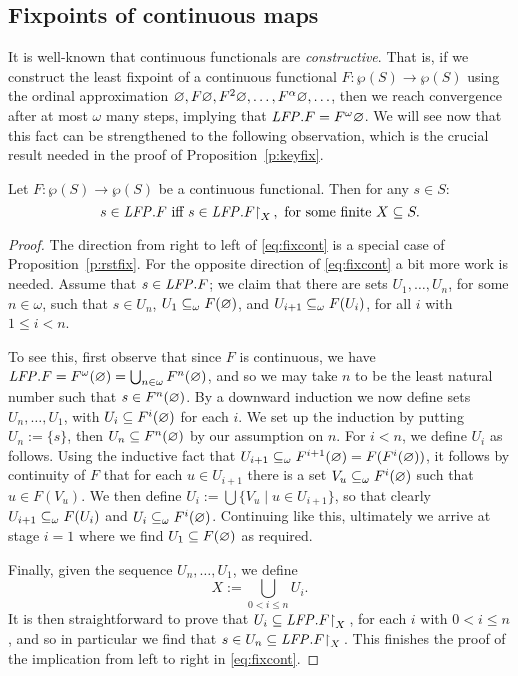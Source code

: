 
\subsection{Fixpoints of continuous maps}

It is well-known that continuous functionals are \emph{constructive}.
That is, if we construct the least fixpoint of a continuous functional $F: 
\wp(S) \to \wp(S)$ using the ordinal approximation $\varnothing, F\varnothing, F^2\varnothing, 
\ldots, F^{\alpha}\varnothing, \ldots$, then we reach convergence after at most $\omega$
many steps, implying that $\mathit{LFP}. F = F^{\omega}\varnothing$.
We will see now that this fact can be strengthened to the following observation,
which is the crucial result needed in the proof of Proposition~\ref{p:keyfix}.

\begin{theorem}
\label{t:fixcont}
Let $F: \wp(S)\to \wp(S)$ be a continuous functional.
Then for any $s \in S$:
\begin{equation}
\label{eq:fixcont}
s \in \LFP. F \text{ iff }
s \in \LFP.F\rst{X}, \text{ for some finite } X \subseteq S.
\end{equation}
\end{theorem}

\begin{proof}
The direction from right to left of \eqref{eq:fixcont} is a special case of 
Proposition~\ref{p:rstfix}.
For the opposite direction of \eqref{eq:fixcont} a bit more work is needed.
Assume that $s \in \mathit{LFP}. F$; we claim that there are sets $U_{1},\ldots,U_{n}$,
for some $n \in \omega$, such that $s \in U_{n}$, $U_{1} \subseteq_{\omega} F(\varnothing)$,
and $U_{i+1} \subseteq_{\omega} F(U_{i})$, for all $i$ with $1 \leq i < n$.

To see this, first observe that since $F$ is continuous, we have $\mathit{LFP}. F = 
F^{\omega}(\varnothing) = \bigcup_{n\in\omega}F^{n}(\varnothing)$, and so we may take $n$ to
be the least natural number such that $s \in F^{n}(\varnothing)$.
By a downward induction we now define sets $U_{n},\ldots,U_{1}$, with $U_{i} 
\subseteq F^{i}(\varnothing)$ for each $i$. 
We set up the induction by putting $U_{n} \mathrel{:=} \{ s \}$, then $U_{n}
\subseteq F^{n}(\varnothing)$ by our assumption on $n$.
For $i<n$, we define $U_{i}$ as follows.
Using the inductive fact that $U_{i+1} \subseteq_{\omega} F^{i+1}(\varnothing) = 
F(F^{i}(\varnothing))$, it follows by continuity of $F$ that for each $u \in U_{i+1}$
there is a set $V_{u} \subseteq_{\omega} F^{i}(\varnothing)$ such that $u \in F(V_{u})$.
We then define $U_{i} \mathrel{:=} \bigcup \{ V_{u} \mid u \in U_{i+1} \}$,
so that clearly $U_{i+1} \subseteq_{\omega} F(U_{i})$ and $U_{i} \subseteq_{\omega}
F^{i}(\varnothing)$.
Continuing like this, ultimately we arrive at stage $i=1$ where we find
$U_{1} \subseteq F(\varnothing)$ as required.

Finally, given the sequence $U_{n},\ldots,U_{1}$, we define 
\[
X \mathrel{:=} \bigcup_{0<i\leq n} U_{i}.
\]
It is then straightforward to prove that $U_{i} \subseteq \mathit{LFP}. F{\upharpoonright}_{X}\,$, for each 
$i$ with $0<i\leq n$, and so in particular we find that $s \in U_{n} \subseteq \mathit{LFP}.
F{\upharpoonright}_{X}\,$.
This finishes the proof of the implication from left to right in 
\eqref{eq:fixcont}.
\end{proof}


